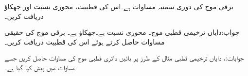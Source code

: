 برقی موج کی دوری سمتیہ  مساوات  ہے۔اس کی قطبیت، محوری نسبت اور جھکاؤ دریافت کریں۔

جواب:دایاں ترخیمی قطبی موج۔ محوری نسبت  ہے۔جھکاؤ  ہے۔
برقی موج  کی حقیقی مساوات حاصل کرتے ہوئے اس کی قطبیت دریافت کریں۔

جوابات:، دایاں ترخیمی قطبی
مثال  کے طرز پر بائیں دائری قطبی موج کی مساوات حاصل کریں جسے مساوات  میں پیش کیا گیا ہے۔

